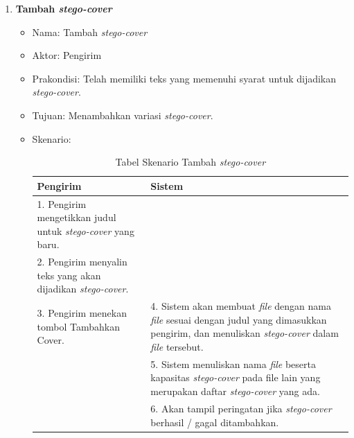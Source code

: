 \begin{enumerate}
\begin{itemize}
\begin{table}[H]
\begin{tabular}{| p{6.5cm} | p{6.5cm} |}
		\hline
		\end{tabular}
		\end{table}
			
	\end{itemize}
	
	\item \textbf{Tambah \textit{stego-cover}}
	\begin{itemize}
		\item Nama: Tambah \textit{stego-cover}
		\item Aktor: Pengirim
		\item Prakondisi: Telah memiliki teks yang memenuhi syarat untuk dijadikan \textit{stego-cover}.
		\item Tujuan: Menambahkan variasi \textit{stego-cover}.
		\item Skenario:
		\begin{table}[H]
		\centering
		\caption{Tabel Skenario Tambah \textit{stego-cover}}
		\begin{tabular}{| p{6.5cm} | p{6.5cm} |}\hline
		Pengirim & Sistem \\
		\hline
				1. Pengirim mengetikkan judul untuk \textit{stego-cover} yang baru. & \\
				\hline
				2. Pengirim menyalin teks yang akan dijadikan \textit{stego-cover}. & \\
				\hline
				3. Pengirim menekan tombol Tambahkan Cover. & 4. Sistem akan membuat \textit{file} dengan nama \textit{file} sesuai dengan judul yang dimasukkan pengirim, dan menuliskan \textit{stego-cover} dalam \textit{file} tersebut. \\
				\hline
				& 5. Sistem menuliskan nama \textit{file} beserta kapasitas \textit{stego-cover} pada file lain yang merupakan daftar \textit{stego-cover} yang ada. \\
				\hline
				& 6. Akan tampil peringatan jika \textit{stego-cover} berhasil / gagal ditambahkan. \\
		\hline
		\end{tabular}
		\end{table}
	\end{itemize}
	

\end{enumerate}
